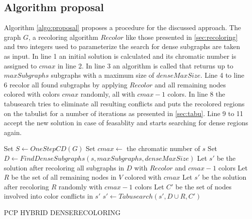 \subsection{Algorithm proposal}
Algorithm \ref{algo:proposal} proposes a procedure for the discussed approach. The graph $G$, a recoloring algorithm $\mathit{Recolor}$ like those presented in \ref{sec:recoloring} and two integers used to parameterize the search for dense subgraphs are taken as input. In line 1 an initial solution is calculated and its chromatic number is assigned to $cmax$ in line 2. In line 3 an algorithm is called that returns up to $\mathit{maxSubgraphs}$ subgraphs with a maximum size of $\mathit{denseMaxSize}$. Line 4 to line 6 recolor all found subgraphs by applying $\mathit{Recolor}$ and all remaining nodes colored with colors $\mathit{cmax}$ randomly, all with $\mathit{cmax-1}$ colors. In line 8 the tabusearch tries to eliminate all resulting conflicts and puts the recolored regions on the tabulist for a number of iterations as presented in \ref{sec:tabu}. Line 9 to 11 accept the new solution in case of feasablity and starts searching for dense regions again.

\begin{algorithm}
Set $S \gets \mathit{OneStepCD}(G)$\;
Set $cmax \gets$ the chromatic number of $s$\;
Set $D \gets \mathit{FindDenseSubgraphs}( s, \mathit{maxSubgraphs}, \mathit{denseMaxSize}) $\;
Let $s'$ be the solution after recoloring all subgraphs in $D$ with $\mathit{Recolor}$ and $cmax-1$ colors\;
Let $R$ be the set of all remaining nodes in $V$ colored with $cmax$\;
Let $s'$ be the solution after recoloring $R$ randomly with $cmax-1$ colors\;
Let $C'$ be the set of nodes involved into color conflicts in $s'$\;
$s' \gets \mathit{Tabusearch}(s', D \cup R, C')$\;
\;
\caption{PCP HYBRID DENSERECOLORING}
\label{algo:proposal}
\end{algorithm}




